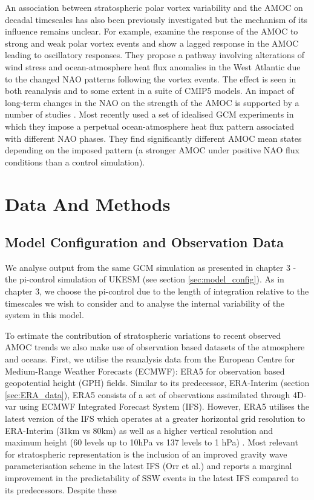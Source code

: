 An association between stratospheric polar vortex variability and the AMOC on decadal timescales has also been previously investigated \citep{reichlerStratospheric2012, Schimanke2011} but the mechanism of its influence remains unclear. For example, \cite{reichlerStratospheric2012} examine the response of the AMOC to strong and weak polar vortex events and show a lagged response in the AMOC leading to oscillatory responses. They propose a pathway involving alterations of wind stress and ocean-atmosphere heat flux anomalies in the West Atlantic due to the changed NAO patterns following the vortex events. The effect is seen in both reanalysis and to some extent in a suite of CMIP5 models. An impact of long-term changes in the NAO on the strength of the AMOC is supported by a number of studies \citep{visbeckOcean1998, delworthImplications2000, delworthMultidecadal2000, edenMechanism2001}. Most recently \cite{delworthImpact2016} used a set of idealised GCM experiments in which they impose a perpetual ocean-atmosphere heat flux pattern associated with different NAO phases. They find significantly different AMOC mean states depending on the imposed pattern (a stronger AMOC under positive NAO flux conditions than a control simulation). 


\section{Data And Methods}
\subsection{Model Configuration and Observation Data}

We analyse output from the same GCM simulation as presented in chapter 3 - the pi-control simulation of UKESM (see section \ref{sec:model_config}). As in chapter 3, we choose the pi-control due to the length of integration relative to the timescales we wish to consider and to analyse the internal variability of the system in this model. 

To estimate the contribution of stratospheric variations to recent observed AMOC trends we also make use of observation based datasets of the atmosphere and oceans. First, we utilise the reanalysis data from the European Centre for Medium-Range Weather Forecasts (ECMWF): ERA5 \citep{hersbachERA52020} for observation based geopotential height (GPH) fields. Similar to its predecessor, ERA-Interim (section \ref{sec:ERA_data}), ERA5 consists of a set of observations assimilated through 4D-var using ECMWF Integrated Forecast System (IFS). However, ERA5 utilises the latest version of the IFS which operates at a greater horizontal grid resolution to ERA-Interim (31km vs 80km) as well as a higher vertical resolution and maximum height (60 levels up to 10hPa vs 137 levels to 1 hPa) \citep{hersbachERA52020}. Most relevant for stratospheric representation is the inclusion of an improved gravity wave parameterisation scheme in the latest IFS (Orr et al.) and \cite{hersbachERA52020} reports a marginal improvement in the predictability of SSW events in the latest IFS compared to its predecessors. Despite these 

